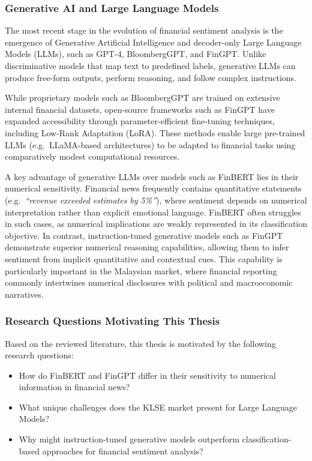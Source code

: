 \documentclass[singlespace]{ucetd}
\begin{document}
\subsubsection{Generative AI and Large Language Models}

The most recent stage in the evolution of financial sentiment analysis is the emergence of Generative Artificial Intelligence and decoder-only Large Language Models (LLMs), such as GPT-4, BloombergGPT, and FinGPT. Unlike discriminative models that map text to predefined labels, generative LLMs can produce free-form outputs, perform reasoning, and follow complex instructions.

While proprietary models such as BloombergGPT are trained on extensive internal financial datasets, open-source frameworks such as FinGPT have expanded accessibility through parameter-efficient fine-tuning techniques, including Low-Rank Adaptation (LoRA). These methods enable large pre-trained LLMs (e.g.\ LLaMA-based architectures) to be adapted to financial tasks using comparatively modest computational resources.

A key advantage of generative LLMs over models such as FinBERT lies in their numerical sensitivity. Financial news frequently contains quantitative statements (e.g.\ \emph{``revenue exceeded estimates by 5\%''}), where sentiment depends on numerical interpretation rather than explicit emotional language. FinBERT often struggles in such cases, as numerical implications are weakly represented in its classification objective. In contrast, instruction-tuned generative models such as FinGPT demonstrate superior numerical reasoning capabilities, allowing them to infer sentiment from implicit quantitative and contextual cues. This capability is particularly important in the Malaysian market, where financial reporting commonly intertwines numerical disclosures with political and macroeconomic narratives.

\subsubsection{Research Questions Motivating This Thesis}

Based on the reviewed literature, this thesis is motivated by the following research questions:

\begin{itemize}
    \item How do FinBERT and FinGPT differ in their sensitivity to numerical information in financial news?
    \item What unique challenges does the KLSE market present for Large Language Models?
    \item Why might instruction-tuned generative models outperform classification-based approaches for financial sentiment analysis?
\end{itemize}
\end{document}
